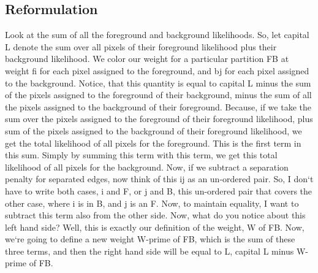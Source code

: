 \subsection{Reformulation}
Look at the sum of all the foreground and background likelihoods.
So, let capital L denote the sum over all pixels of their foreground likelihood plus their background likelihood.
We color our weight for a particular partition FB at weight fi for each pixel assigned to the foreground, and bj for each pixel assigned to the background.
Notice, that this quantity is equal to capital L minus the sum of the pixels assigned to the foreground of their background, minus the sum of all the pixels assigned to the background of their foreground.
Because, if we take the sum over the pixels assigned to the foreground of their foreground likelihood, plus sum of the pixels assigned to the background of their foreground likelihood, we get the total likelihood of all pixels for the foreground.
This is the first term in this sum.
Simply by summing this term with this term, we get this total likelihood of all pixels for the background.
Now, if we subtract a separation penalty for separated edges, now think of this ij as an un-ordered pair.
So, I don`t have to write both cases, i and F, or j and B, this un-ordered pair that covers the other case, where i is in B, and j is an F\@.
Now, to maintain equality, I want to subtract this term also from the other side.
Now, what do you notice about this left hand side? Well, this is exactly our definition of the weight, W of FB\@.
Now, we`re going to define a new weight W-prime of FB, which is the sum of these three terms, and then the right hand side will be equal to L, capital L minus W-prime of FB\@.

